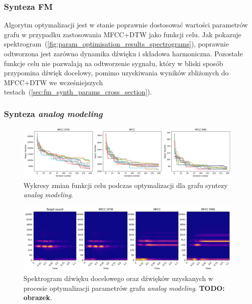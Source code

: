 \subsubsection{Synteza FM}

Algorytm optymalizacji jest w stanie poprawnie dostosować wartości parametrów grafu w przypadku
zastosowania MFCC+DTW jako funkcji celu. Jak pokazuje spektrogram~(\ref{fig:param_optimisation_results_spectrograms}),
poprawnie odtworzona jest zarówno dynamika dźwięku i składowa harmoniczna. Pozostałe funkcje celu nie pozwalają
na odtworzenie sygnału, który w bliski sposób przypomina dźwięk docelowy, pomimo uzyskiwania wyników zbliżonych
do MFCC+DTW we wcześniejszych testach~(\ref{sec:fm_synth_params_cross_section}).

\subsubsection{Synteza \textit{analog modeling}}

\begin{figure}[H]
    \centering
    \includegraphics[width=1.0\linewidth]{rys03/am_training_results.png}
    \caption{
      Wykresy zmian funkcji celu podczas optymalizacji dla grafu syntezy \textit{analog modeling}.
    }\label{fig:am_target_fun_plots}
\end{figure}

\begin{figure}[H]
    \centering
    \includegraphics[width=1.0\linewidth]{rys03/spectro_results_am.png}
    \caption{
      Spektrogram dźwięku docelowego oraz dźwięków uzyskanych w procesie
      optymalizacji parametrów grafu \textit{analog modeling}.
      \textbf{TODO\@: obrazek}.
    }\label{fig:am_param_optimisation_results_spectrograms}
\end{figure}

